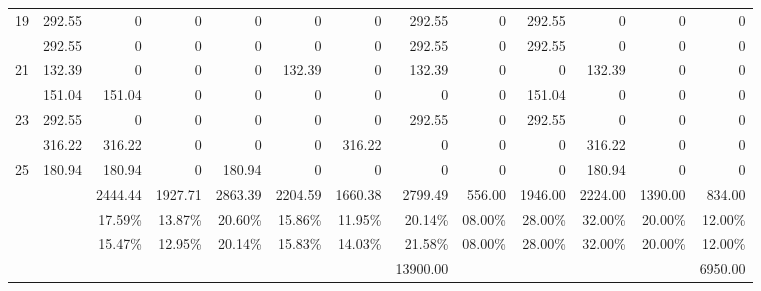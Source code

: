 \begin{sidewaystable}
\begin{tabular}{c*{12}{r}}
19 & 292.55 & 0 & 0 & 0 & 0 & 0 & 292.55 & 0 & 292.55 & 0 & 0 & 0 \\
\gray 20 & 292.55 & 0 & 0 & 0 & 0 & 0 & 292.55 & 0 & 292.55 & 0 & 0 & 0 \\
21 & 132.39 & 0 & 0 & 0 & 132.39 & 0 & 132.39 & 0 & 0 & 132.39 & 0 & 0 \\
\gray 22 & 151.04 & 151.04 & 0 & 0 & 0 & 0 & 0 & 0 & 151.04 & 0 & 0 & 0 \\
23 & 292.55 & 0 & 0 & 0 & 0 & 0 & 292.55 & 0 & 292.55 & 0 & 0 & 0 \\
\gray 24 & 316.22 & 316.22 & 0 & 0 & 0 & 316.22 & 0 & 0 & 0 & 316.22 & 0 & 0 \\
25 & 180.94 & 180.94 & 0 & 180.94 & 0 & 0 & 0 & 0 & 0 & 180.94 & 0 & 0 \\
\hline
 &  & 2444.44 & 1927.71 & 2863.39 & 2204.59 & 1660.38 & 2799.49 & 556.00 & 1946.00 & 2224.00 & 1390.00 & 834.00 \\
 &  & 17.59\% & 13.87\% & 20.60\% & 15.86\% & 11.95\% & 20.14\% & 08.00\% & 28.00\% & 32.00\% & 20.00\% & 12.00\% \\
\rowcolor{yellow!10} \cellcolor{white} & \cellcolor{white} & 15.47\% & 12.95\% & 20.14\% & 15.83\% & 14.03\% & 21.58\% & 08.00\% & 28.00\% & 32.00\% & 20.00\% & 12.00\% \\
 &  &  &  &  &  &  & 13900.00 &  &  &  &  & 6950.00 \\
\hline
\end{tabular}
\end{sidewaystable}


